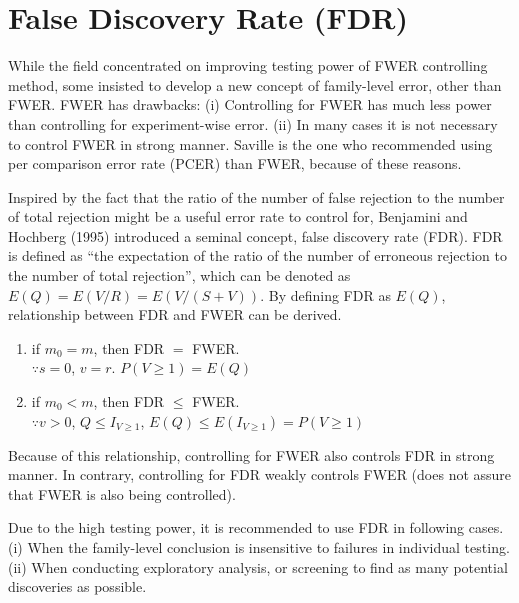 \documentclass[a4paper, 11pt, oneside]{article}
\begin{document}
\section{False Discovery Rate (FDR)}
While the field concentrated on improving testing power of FWER controlling method, some insisted to develop a new concept of family-level error, other than FWER. FWER has drawbacks: (i) Controlling for FWER has much less power than controlling for experiment-wise error. (ii) In many cases it is not necessary to control FWER in strong manner. Saville is the one who recommended using per comparison error rate (PCER) than FWER, because of these reasons. \par
    Inspired by the fact that the ratio of the number of false rejection to the number of total rejection might be a useful error rate to control for, Benjamini and Hochberg (1995) introduced a seminal concept, false discovery rate (FDR). FDR is defined as \enquote{the expectation of the ratio of the number of erroneous rejection to the number of total rejection}, which can be denoted as $E(Q)=E(V/R)=E(V/(S+V))$. By defining FDR as $E(Q)$, relationship between FDR and FWER can be derived.
    \begin{enumerate}
    \item if $m_0=m$, then FDR $=$ FWER. \\
      $\because s=0$, $v=r$. $P(V \geq 1)= E(Q)$
    \item if $m_0<m$, then FDR $\leq$ FWER. \\
      $\because v>0$, $Q \leq I_{V \geq 1}$, $E(Q) \leq E(I_{V \geq 1}) = P(V \geq 1)$
    \end{enumerate}
Because of this relationship, controlling for FWER also controls FDR in strong manner. In contrary, controlling for FDR weakly controls FWER (does not assure that FWER is also being controlled). \par
    Due to the high testing power, it is recommended to use FDR in following cases. (i) When the family-level conclusion is insensitive to failures in individual testing. (ii) When conducting exploratory analysis, or screening to find as many potential discoveries as possible.
\end{document}
